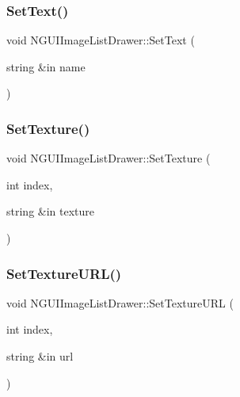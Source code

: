 \hypertarget{class_n_g_u_i_image_list_drawer_ab7aed12cc103d7ed6e5faf7c15bc8f0d}{}\label{class_n_g_u_i_image_list_drawer_ab7aed12cc103d7ed6e5faf7c15bc8f0d} 
\subsubsection{\texorpdfstring{Set\+Text()}{SetText()}}
{\footnotesize\ttfamily void N\+G\+U\+I\+Image\+List\+Drawer\+::\+Set\+Text (\begin{DoxyParamCaption}\item[{string \&in}]{name }\end{DoxyParamCaption})}

\hypertarget{class_n_g_u_i_image_list_drawer_aef3eb4ace9c916fddcc061836b43f277}{}\label{class_n_g_u_i_image_list_drawer_aef3eb4ace9c916fddcc061836b43f277} 
\subsubsection{\texorpdfstring{Set\+Texture()}{SetTexture()}}
{\footnotesize\ttfamily void N\+G\+U\+I\+Image\+List\+Drawer\+::\+Set\+Texture (\begin{DoxyParamCaption}\item[{int}]{index,  }\item[{string \&in}]{texture }\end{DoxyParamCaption})}

\hypertarget{class_n_g_u_i_image_list_drawer_a2b1a64bb9fe1794cce4bdcb42d6a4369}{}\label{class_n_g_u_i_image_list_drawer_a2b1a64bb9fe1794cce4bdcb42d6a4369} 
\subsubsection{\texorpdfstring{Set\+Texture\+U\+R\+L()}{SetTextureURL()}}
{\footnotesize\ttfamily void N\+G\+U\+I\+Image\+List\+Drawer\+::\+Set\+Texture\+U\+RL (\begin{DoxyParamCaption}\item[{int}]{index,  }\item[{string \&in}]{url }\end{DoxyParamCaption})}

